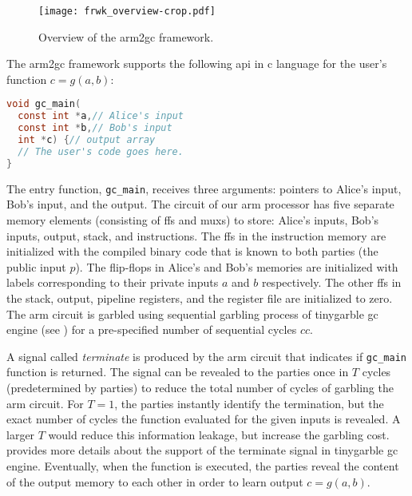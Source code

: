 \begin{figure}
\centering
\texttt{[image: frwk\_overview-crop.pdf]}
\caption{Overview of the \gls{arm2gc} framework.}\label{fig:frwk_overview}
\end{figure}

The \gls{arm2gc} framework supports the following \acrshort{api} in \gls{c} language for the user's function $c = g(a,b)$:
\begin{lstlisting}[language=C,basicstyle=\ttfamily,keywordstyle=\color{blue}\ttfamily,stringstyle=\color{red}\ttfamily,commentstyle=\color{CommentColor}\ttfamily]
void gc_main(
  const int *a,// Alice's input
  const int *b,// Bob's input
  int *c) {// output array
  // The user's code goes here.
}
\end{lstlisting}

The entry function, \texttt{gc\_main}, receives three arguments: pointers to Alice's input, Bob's input, and the output.
The circuit of our \gls{arm} processor has five separate memory elements (consisting of \acrshort{ff}s and \acrshort{mux}s) to store: Alice's inputs, Bob's inputs, output, stack, and instructions.
The \acrshort{ff}s in the instruction memory are initialized with the compiled binary code that is known to both parties (the public input $p$).
The flip-flops in Alice's and Bob's memories are initialized with labels corresponding to their private inputs $a$ and $b$ respectively.
The other \acrshort{ff}s in the stack, output, pipeline registers, and the register file are initialized to zero.
The \gls{arm} circuit is garbled using sequential garbling process of \gls{tinygarble} \acrshort{gc} engine (see ) for a pre-specified number of sequential cycles $cc$.

A signal called \textit{terminate} is produced by the \gls{arm} circuit that indicates if \texttt{gc\_main} function is returned.
The signal can be revealed to the parties once in $T$ cycles (predetermined by parties) to reduce the total number of cycles of garbling the \gls{arm} circuit.
For $T=1$, the parties instantly identify the termination, but the exact number of cycles the function evaluated for the given inputs is revealed.
A larger $T$ would reduce this information leakage, but increase the garbling cost.
 provides more details about the support of the terminate signal in \gls{tinygarble} \acrshort{gc} engine.
Eventually, when the function is executed, the parties reveal the content of the output memory to each other in order to learn output $c = g(a,b)$.

